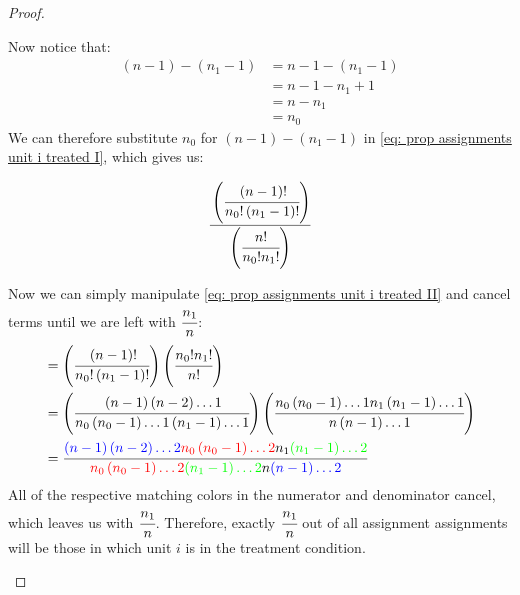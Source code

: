 \documentclass[12pt,leqno]{article}
\theoremstyle{newstyle}
\begin{document}
\begin{proof}
\begin{enumerate}
Now notice that:
\begin{align*}
\left(n - 1\right) - \left(n_1 - 1\right) & = n - 1 - \left(n_1 - 1\right) \\
& = n - 1 - n_1 + 1 \\
& = n - n_1 \\
& = n_0
\end{align*}
We can therefore substitute $n_0$ for $\left(n - 1\right) - \left(n_1 - 1\right)$ in \eqref{eq: prop assignments unit i treated I}, which gives us:

\begin{equation}\label{eq: prop assignments unit i treated II}
\cfrac{\left(\cfrac{\left(n - 1\right)!}{n_0!\left(n_1 - 1\right)!}\right)}{\left(\cfrac{n!}{n_0!n_1!}\right)} \\
\end{equation}

Now we can simply manipulate \eqref{eq: prop assignments unit i treated II} and cancel terms until we are left with $\cfrac{n_1}{n}$:
\begin{align*}
& = \left(\cfrac{\left(n - 1\right)!}{n_0!\left(n_1 - 1\right)!}\right)\left(\cfrac{n_0!n_1!}{n!}\right) \\
& = \left(\cfrac{\left(n - 1\right)\left(n - 2\right) \dots 1}{n_0\left(n_0 - 1\right) \dots 1 \left(n_1 - 1\right) \dots 1}\right) \left(\cfrac{n_0\left(n_0 - 1\right) \dots 1 n_1 \left(n_1 - 1\right) \dots 1}{n\left(n - 1\right) \dots 1}\right) \\
& = \cfrac{\textcolor{blue}{\left(n - 1\right)\left(n - 2\right) \dots 2} \textcolor{red}{n_0\left(n_0 - 1\right) \dots 2} n_1 \textcolor{green}{\left(n_1 - 1\right) \dots 2}}{\textcolor{red}{n_0\left(n_0 - 1\right) \dots 2} \textcolor{green}{\left(n_1 - 1\right) \dots 2} n\textcolor{blue}{\left(n - 1\right) \dots 2}} \\
\end{align*}
All of the respective matching colors in the numerator and denominator cancel, which leaves us with $\cfrac{n_1}{n}$. Therefore, exactly $\cfrac{n_1}{n}$ out of all assignment assignments will be those in which unit $i$ is in the treatment condition. 


\end{enumerate}
\end{proof}
\end{document}
